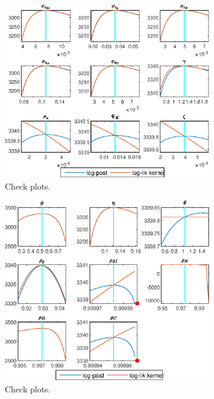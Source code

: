  
\begin{figure}[H]
\centering 
\includegraphics[width=0.80\textwidth]{BRS_imp_mobility/graphs/BRS_imp_mobility_CheckPlots1}
\caption{Check plots.}\label{Fig:CheckPlots:1}
\end{figure}
 
\begin{figure}[H]
\centering 
\includegraphics[width=0.80\textwidth]{BRS_imp_mobility/graphs/BRS_imp_mobility_CheckPlots2}
\caption{Check plots.}\label{Fig:CheckPlots:2}
\end{figure}
 
